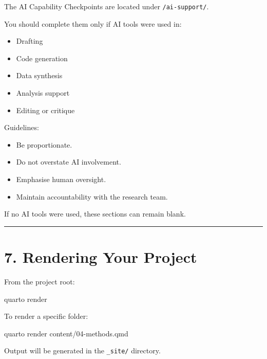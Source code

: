 \documentclass[
]{report}
\newenvironment{Shaded}{\begin{snugshade}}{\end{snugshade}}
\newcommand{\ExtensionTok}[1]{\textcolor[rgb]{0.00,0.23,0.31}{#1}}
\newcommand{\NormalTok}[1]{\textcolor[rgb]{0.00,0.23,0.31}{#1}}
\providecommand{\tightlist}{%
  \setlength{\itemsep}{0pt}\setlength{\parskip}{0pt}}
\begin{document}
The AI Capability Checkpoints are located under \texttt{/ai-support/}.

You should complete them only if AI tools were used in:

\begin{itemize}
\tightlist
\item
  Drafting
\item
  Code generation
\item
  Data synthesis
\item
  Analysis support
\item
  Editing or critique
\end{itemize}

Guidelines:

\begin{itemize}
\tightlist
\item
  Be proportionate.
\item
  Do not overstate AI involvement.
\item
  Emphasise human oversight.
\item
  Maintain accountability with the research team.
\end{itemize}

If no AI tools were used, these sections can remain blank.

\begin{center}\rule{0.5\linewidth}{0.5pt}\end{center}

\section{7. Rendering Your Project}\label{rendering-your-project}

From the project root:

\begin{Shaded}
\begin{Highlighting}[]
\ExtensionTok{quarto}\NormalTok{ render}
\end{Highlighting}
\end{Shaded}

To render a specific folder:

\begin{Shaded}
\begin{Highlighting}[]
\ExtensionTok{quarto}\NormalTok{ render content/04{-}methods.qmd}
\end{Highlighting}
\end{Shaded}

Output will be generated in the \texttt{\_site/} directory.
\end{document}
